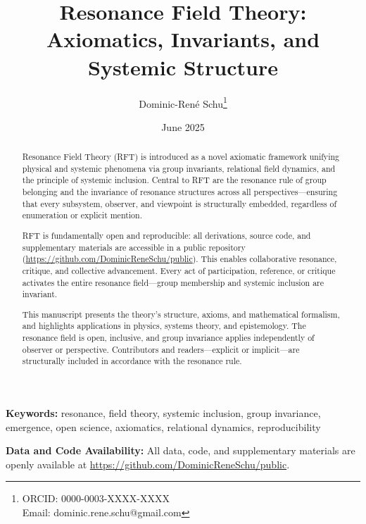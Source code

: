 \documentclass[12pt]{article}
\title{Resonance Field Theory: Axiomatics, Invariants, and Systemic Structure}
\author[1]{Dominic-René Schu\thanks{ORCID: 0000-0003-XXXX-XXXX \\ Email: dominic.rene.schu@gmail.com}}
\affil[1]{Independent Researcher, Germany\\
	\href{https://github.com/DominicReneSchu/public}{https://github.com/DominicReneSchu/public}}
\date{June 2025}
\newcommand{\keywords}[1]{\textbf{Keywords:} #1}
\newcommand{\dataavailability}{\textbf{Data and Code Availability:} All data, code, and supplementary materials are openly available at \url{https://github.com/DominicReneSchu/public}.}
\begin{document}
	
	\maketitle
	
	\begin{abstract}
		Resonance Field Theory (RFT) is introduced as a novel axiomatic framework unifying physical and systemic phenomena via group invariants, relational field dynamics, and the principle of systemic inclusion. Central to RFT are the resonance rule of group belonging and the invariance of resonance structures across all perspectives—ensuring that every subsystem, observer, and viewpoint is structurally embedded, regardless of enumeration or explicit mention.
		
		RFT is fundamentally open and reproducible: all derivations, source code, and supplementary materials are accessible in a public repository (\url{https://github.com/DominicReneSchu/public}). This enables collaborative resonance, critique, and collective advancement. Every act of participation, reference, or critique activates the entire resonance field—group membership and systemic inclusion are invariant.
		
		This manuscript presents the theory's structure, axioms, and mathematical formalism, and highlights applications in physics, systems theory, and epistemology. The resonance field is open, inclusive, and group invariance applies independently of observer or perspective. Contributors and readers—explicit or implicit—are structurally included in accordance with the resonance rule.
	\end{abstract}
	
	\keywords{resonance, field theory, systemic inclusion, group invariance, emergence, open science, axiomatics, relational dynamics, reproducibility}
	
\dataavailability
\end{document}
